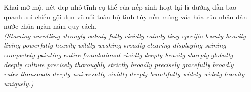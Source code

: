\begin{baihoc}
  Khai mở một nét đẹp nhỏ tĩnh cụ thể của nếp sinh hoạt lại là đường dẫn bao quanh soi chiếu gội dọn vẽ nổi toàn bộ tinh túy nền móng văn hóa của nhân dân nước chúa ngàn năm quy cách.\\[4pt]
  \textit{(Starting unrolling strongly calmly fully vividly calmly tiny specific beauty heavily living powerfully heavily wildly washing broadly clearing displaying shining completely painting entire foundational vividly deeply heavily sharply globally deeply culture precisely thoroughly strictly broadly precisely gracefully broadly rules thousands deeply universally vividly deeply beautifully widely widely heavily uniquely.)}
\end{baihoc}
